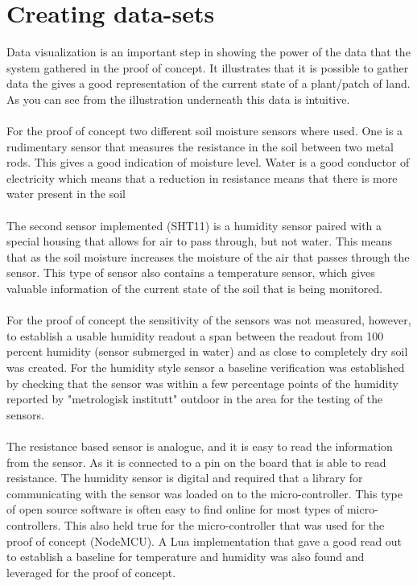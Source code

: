 \documentclass[]{uiophd}
\begin{document}
\section{Creating data-sets}
Data visualization is an important step in showing the power of the data that the system gathered in the proof of concept. It illustrates that it is possible to gather data the gives a good representation of the current state of a plant/patch of land. As you can see from the illustration underneath this data is intuitive.
\\\\
For the proof of concept two different soil moisture sensors where used. One is a rudimentary sensor that measures the resistance in the soil between two metal rods. This gives a good indication of moisture level. Water is a good conductor of electricity which means that a reduction in resistance means that there is more water present in the soil
\\\\
The second sensor implemented (SHT11) is a humidity sensor paired with a special housing that allows for air to pass through, but not water. This means that as the soil moisture increases the moisture of the air that passes through the sensor. This type of sensor also contains a temperature sensor, which gives valuable information of the current state of the soil that is being monitored.
\\\\
For the proof of concept the sensitivity of the sensors was not measured, however, to establish a usable humidity readout a span between the readout from 100 percent humidity (sensor submerged in water) and as close to completely dry soil was created. For the humidity style sensor a baseline verification was established by checking that the sensor was within a few percentage points of the humidity reported by "metrologisk institutt" outdoor in the area for the testing of the sensors.
\\\\
The resistance based sensor is analogue, and it is easy to read the information from the sensor. As it is connected to a pin on the board that is able to read resistance. The humidity sensor is digital and required that a library for communicating with the sensor was loaded on to the micro-controller. This type of open source software is often easy to find online for most types of micro-controllers. This also held true for the micro-controller that was used for the proof of concept (NodeMCU). A Lua implementation that gave a good read out to establish a baseline for temperature and humidity was also found and leveraged for the proof of concept.
\end{document}
